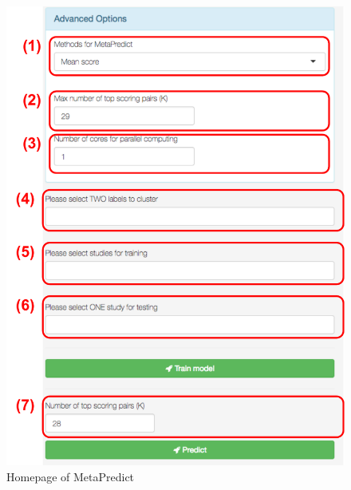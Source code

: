 \begin{figure}[H]
\begin{center}
\includegraphics[scale=0.5]{./figure/MetaPredict/MetaPredictprocedure.pdf}
\caption{Homepage of MetaPredict}
\label{fig:MetaPredictmainpage}
\end{center}
\end{figure}

